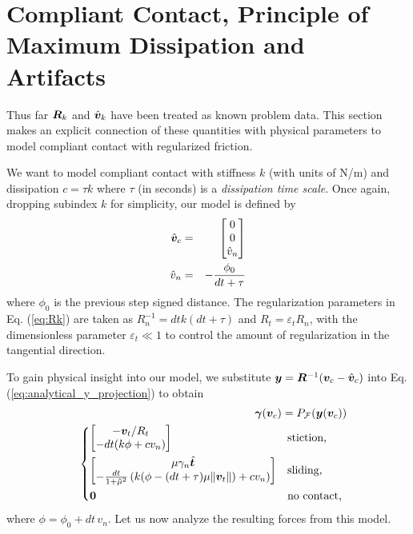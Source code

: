 \section{Compliant Contact, Principle of Maximum Dissipation and Artifacts}
\label{sec:physical_intuition}

Thus far ${\bm{R}}_k$ and $\hat{{\bm{v}}}_k$ have been treated as known problem
data. This section makes an explicit connection of these quantities with
physical parameters to model compliant contact with regularized friction.

We want to model compliant contact with stiffness $k$ (with units of N/m) and
dissipation $c = \tau k$ where $\tau$ (in seconds) is a \textit{dissipation time
scale}. Once again, dropping subindex $k$ for simplicity, our model is defined
by
\begin{eqnarray}
	\hat{{\bm{v}}}_c &=&
	\begin{bmatrix}
		0\\
		0\\
		\hat{v}_n \end{bmatrix}\nonumber\\
	\hat{v}_n &=& -\frac{\phi_0}{dt+\tau}
\end{eqnarray}
where $\phi_0$ is the previous step signed distance. The regularization
parameters in Eq. (\ref{eq:Rk}) are taken as $R_n^{-1} = dt k(dt+\tau)$ and
$R_t=\varepsilon_t R_n$, with the dimensionless parameter $\varepsilon_t \ll 1$
to control the amount of regularization in the tangential direction.

To gain physical insight into our model, we
substitute ${\bm{y}}={\bm{R}}^{-1}({\bm{v}}_c - \hat{{\bm{v}}}_c)$ into Eq.
(\ref{eq:analytical_y_projection}) to obtain
\begin{eqnarray}
	&&\bgamma(\vf{v}_c) = P_\mathcal{F}(\vf{y}(\vf{v}_c))
    \label{eq:gamma_analytical_from_vc}\\
&&\begin{dcases}
	\begin{bmatrix}
		-\vf{v}_t/R_t\\
		-dt(k\phi + c v_n)
	\end{bmatrix}
	& \text{stiction, } \\
	\begin{bmatrix}
		\mu\gamma_n\hat{\vf{t}}\\
		-\frac{dt}{1+\tilde\mu^2}\left(k(\phi-(dt+\tau)\mu\Vert\vf{v}_t\Vert) + cv_n \right)
	\end{bmatrix}
	& \text{sliding, }\\
    \vf{0} & \text{no contact, }
\end{dcases}\nonumber	
\end{eqnarray}
where $\phi= \phi_0 + dt\,v_n$. Let us now analyze the resulting forces from
this model.

